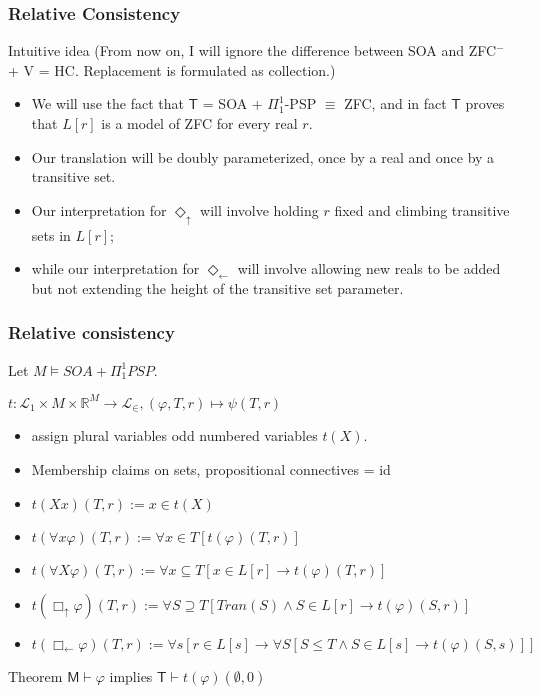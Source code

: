\documentclass{beamer}
\newcommand{\du}{\Diamond_\uparrow}
\newcommand{\dl}{\Diamond_\leftarrow}
\newcommand{\bu}{\Box_\uparrow}
\newcommand{\bl}{\Box_\leftarrow}
\begin{document}
\begin{frame}
    \frametitle{Relative Consistency}
\begin{block}{Intuitive idea}
     (From now on, I will ignore the difference between SOA 
    and ZFC$^-$+ V = HC. Replacement is formulated as collection.)
    \begin{itemize}
    \item<3-> We will use the fact that $\mathsf{T}$ = SOA + $\Pi_1^1$-PSP 
    $\equiv$ ZFC, and in fact $\mathsf{T}$ proves that $L[r]$ is a 
    model of ZFC for every real $r$. 
    \item<4-> 
    Our translation will be doubly parameterized, once by a real and 
    once by a transitive set.
    \item<5->
    Our interpretation for $\du$ will involve holding $r$ fixed and 
    climbing transitive sets in $L[r]$;
    \item<6-> 
    while our interpretation for $\dl$ will involve allowing new reals 
    to be added but not extending the height of the transitive set parameter.
    \end{itemize}
\end{block}
\end{frame}
\begin{frame}
    \frametitle{Relative consistency}
     Let $M \vDash SOA + \Pi_1^1 PSP$.
    \begin{block}{$t : \mathcal{L}_1 \times M \times \mathbb{R}^M \to \mathcal{L}_\in, (\varphi, T, r) \mapsto \psi(T, r)$}
        \begin{itemize}
            \item<4-> assign plural variables odd numbered variables $t(X)$.
            \item<5-> Membership claims on sets, propositional connectives = id 
            \item<6-> $t(Xx)(T, r) := x \in t(X)$
            \item<7-> $t(\forall x \varphi)(T, r) := \forall x \in T [t(\varphi)(T, r)]$
            \item<8-> $t(\forall X \varphi)(T, r) := \forall x \subseteq T [x \in L[r] \rightarrow t(\varphi)(T, r)]$
            \item<9-> $t(\bu \varphi)(T, r) := \forall S \supseteq T [Tran(S) \wedge S \in L[r] \rightarrow t(\varphi)(S, r)]$
            \item<10-> $t(\bl \varphi)(T, r) := \forall s[ r \in L[s] \rightarrow \forall S[ S \leq T \wedge S \in L[s] \rightarrow t(\varphi)(S, s)]]$
        \end{itemize}
    \end{block}
\begin{block}{Theorem}
  $\mathsf{M} \vdash \varphi$ implies $\mathsf{T} \vdash t(\varphi)(\emptyset, 0)$  
\end{block}
\end{frame}
\end{document}
